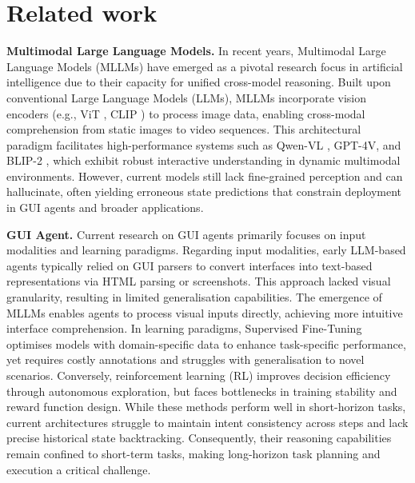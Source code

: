 \documentclass{article} %
\newcommand{\mypara}[1]{\vspace{0.4em}\noindent\textbf{#1}\hspace{0.2cm}}
\begin{document}
\section{Related work}
\label{sec:Related}

\mypara{Multimodal Large Language Models.}
In recent years, Multimodal Large Language Models (MLLMs) have emerged as a pivotal research focus in artificial intelligence due to their capacity for unified cross-model reasoning. Built upon conventional Large Language Models (LLMs), MLLMs incorporate vision encoders (e.g., ViT \citep{vit}, CLIP \citep{clip}) to process image data, enabling cross-modal comprehension from static images to video sequences. This architectural paradigm facilitates high-performance systems such as Qwen-VL \citep{Qwen2.5-VL}, GPT-4V\citep{openai2024gpt4technicalreport}, and BLIP-2 \citep{Li_2023_ICML_BLIP2}, which exhibit robust interactive understanding in dynamic multimodal environments. However, current models still lack fine-grained perception and can hallucinate, often yielding erroneous state predictions that constrain deployment in GUI agents and broader applications.



\mypara{GUI Agent.} Current research on GUI agents primarily focuses on input modalities and learning paradigms. Regarding input modalities, early LLM-based agents \citep{lee_2024_explore, putta_2024_agent, 2024_SIGKDD_AutoWebGLM} typically relied on GUI parsers to convert interfaces into text-based representations via HTML parsing or screenshots. This approach lacked visual granularity, resulting in limited generalisation capabilities. The emergence of MLLMs \citep{NEURIPS2024_0520537b, NEURIPS2023_7cc1005e} enables agents to process visual inputs directly, achieving more intuitive interface comprehension. In learning paradigms, Supervised Fine-Tuning \citep{furuta_2024_multimodalweb, li_2024_appagentv2} optimises models with domain-specific data to enhance task-specific performance, yet requires costly annotations and struggles with generalisation to novel scenarios. Conversely, reinforcement learning (RL) \citep{shi_2025_mobileguirl, luo_2025_guir1, yuan2025enhancing} improves decision efficiency through autonomous exploration, but faces bottlenecks in training stability and reward function design. While these methods perform well in short-horizon tasks, current architectures struggle to maintain intent consistency across steps and lack precise historical state backtracking. Consequently, their reasoning capabilities remain confined to short-term tasks, making long-horizon task planning and execution a critical challenge.
\end{document}
